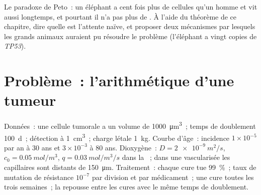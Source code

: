 \begin{exercise}[$\star\star\star$]\label{exo:b3:cancer-biology:12}
Le paradoxe de Peto~: un éléphant a cent fois plus de cellules qu'un
homme et vit aussi longtemps, et pourtant il n'a pas plus de . À
l'aide du théorème de ce chapitre, dire quelle est l'attente naïve, et
proposer deux mécanismes par lesquels les grands animaux auraient pu
résoudre le problème (l'éléphant a vingt copies de \emph{TP53}).
\end{exercise}

\section{Problème~: l'arithmétique d'une tumeur}

\begin{problem}
\label{pb:b3:cancer-biology:1}
Données~: une cellule tumorale a un volume de \qty{1000}{\micro m^3}~;
temps de doublement \qty{100}{d}~; détection à \qty{1}{cm^3}~; charge
létale \qty{1}{kg}. Courbe d'âge~: incidence $1\times 10^{-5}$ par an à
$30$ ans et $3\times
10^{-3}$ à $80$ ans. Dioxygène~: $D = \qty{2e-9}{m^2/s}$, $c_{0} =
\qty{0.05}{mol/m^3}$, $q = \qty{0.03}{mol/m^3/s}$ dans la ~; dans
une  vascularisée les capillaires sont distants de
\qty{150}{\micro m}. Traitement~: chaque cure tue \qty{99}{\%}~; taux de
mutation de résistance $10^{-7}$ par division et par médicament~; une
cure toutes les trois semaines~; la  repousse entre les cures
avec le même temps de doublement.


\end{problem}
